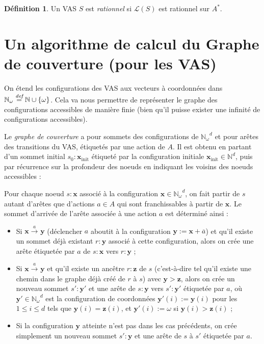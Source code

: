 \documentclass[a4paper,final]{article}
\theoremstyle{definition}
\newtheorem{Definition}{Définition}
\let\leq\leqslant
\newcommand{\os}[1]{\left\{\mathinner{#1}\right\}}
\newcommand{\defeq}{\ensuremath{\stackrel{\textit{def}}{=}}}
\let\union\cup
\newcommand{\N}{\ensuremath{\mathbb{N}}}
\newcommand{\Nomega}{\ensuremath{\mathbb{N}_\omega}}
\newcommand{\lang}{\ensuremath{\mathcal{L}}}
\newcommand{\trans}[2]{\ensuremath{\stackrel{#1}{\longrightarrow}_{#2}}}
\newcommand{\vect}[1]{\ensuremath{\mathbf{#1}}}
\newcommand{\xinit}{\ensuremath{\vect{x}_\text{init}}}
\newcommand{\valeur}[1]{\ensuremath{\overline{#1}}}
\begin{document}
\begin{Definition}
Un VAS $S$ est \emph{rationnel} si $\lang(S)$ est rationnel sur $A^\ast$.
\end{Definition}

\section{Un algorithme de calcul du Graphe de couverture (pour les VAS)}

On étend les configurations des VAS aux vecteurs à coordonnées dans $\Nomega\defeq \N\union\os{\omega}$.
Cela va nous permettre de représenter le graphe des configurations accessibles de manière finie (bien qu'il puisse exister une infinité de configurations accessibles).

Le \emph{graphe de couverture} a pour sommets des configurations de $\Nomega^d$ et pour arêtes des transitions du VAS, étiquetés par une action de $A$.
Il est obtenu en partant d'un sommet initial $s_0:\xinit$ étiqueté par la configuration initiale $\xinit\in \N^d$, puis par récurrence sur la profondeur des noeuds en indiquant les voisins des noeuds accessibles :

Pour chaque noeud $s:\vect{x}$ associé à la configuration $\vect{x}\in \Nomega^d$, on fait partir de $s$ autant d'arêtes que d'actions $a\in A$ qui sont franchissables à partir de $\vect{x}$.
Le sommet d'arrivée de l'arête associée à une action $a$ est déterminé ainsi :
\begin{itemize}
    \item Si $\vect{x}\trans{a}{} \vect{y}$ (déclencher $a$ aboutit à la configuration $\vect{y} := \vect{x} + \valeur{a}$) 
    et qu'il existe un sommet déjà existant $r:\vect{y}$ associé à cette configuration, alors on crée une arête étiquetée par $a$ de $s:\vect{x}$ vers $r:\vect{y}$ ;
    \item Si $\vect{x}\trans{a}{} \vect{y}$ et qu'il existe un ancêtre $r:\vect{z}$ de $s$ (c'est-à-dire tel qu'il existe une chemin dans le graphe déjà créé de $r$ à $s$) avec $\vect{y}>\vect{z}$, 
    alors on crée un nouveau sommet $s':\vect{y'}$ et une arête de $s:\vect{y}$ vers $s':\vect{y'}$ étiquetée par $a$, 
    où $\vect{y'}\in \Nomega^d$ est la configuration de coordonnées $\vect{y'}(i):=\vect{y}(i)$ pour les $1\leq i\leq d$ tels que $\vect{y}(i)=\vect{z}(i)$, et $\vect{y'}(i):=\omega$ si $\vect{y}(i)>\vect{z}(i)$ ;
    \item Si la configuration $\vect{y}$ atteinte n'est pas dans les cas précédents, on crée simplement un nouveau sommet $s':\vect{y}$ et une arête de $s$ à $s'$ étiquetée par $a$.
\end{itemize}
\end{document}
